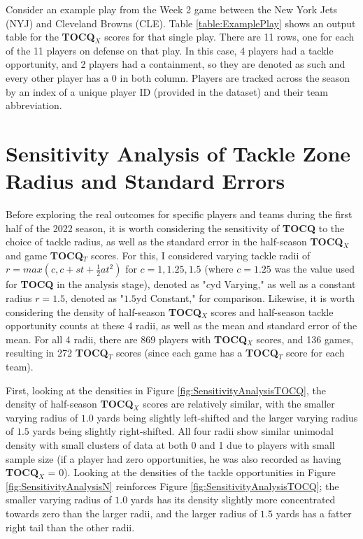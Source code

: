 \documentclass{article}
\begin{document}
Consider an example play from the Week 2 game between the New York Jets (NYJ) and Cleveland Browns (CLE). Table \ref{table:ExamplePlay} shows an output table for the \textbf{TOCQ$_X$} scores for that single play. There are 11 rows, one for each of the 11 players on defense on that play. In this case, 4 players had a tackle opportunity, and 2 players had a containment, so they are denoted as such and every other player has a 0 in both column. Players are tracked across the season by an index of a unique player ID (provided in the dataset) and their team abbreviation.

\section{Sensitivity Analysis of Tackle Zone Radius and Standard Errors}

Before exploring the real outcomes for specific players and teams during the first half of the 2022 season, it is worth considering the sensitivity of \textbf{TOCQ} to the choice of tackle radius, as well as the standard error in the half-season \textbf{TOCQ$_X$} and game \textbf{TOCQ$_T$} scores. For this, I considered varying tackle radii of $r = max(c, c + st + \frac{1}{2}at^2)$ for $c = 1, 1.25, 1.5$ (where $c = 1.25$ was the value used for \textbf{TOCQ} in the analysis stage), denoted as "$c$yd Varying," as well as a constant radius $r = 1.5$, denoted as "$1.5$yd Constant," for comparison. Likewise, it is worth considering the density of half-season \textbf{TOCQ$_X$} scores and half-season tackle opportunity counts at these 4 radii, as well as the mean and standard error of the mean. For all 4 radii, there are 869 players with \textbf{TOCQ$_X$} scores, and 136 games, resulting in 272 \textbf{TOCQ$_T$} scores (since each game has a \textbf{TOCQ$_T$} score for each team).

First, looking at the densities in Figure \ref{fig:SensitivityAnalysisTOCQ}, the density of half-season \textbf{TOCQ$_X$} scores are relatively similar, with the smaller varying radius of $1.0$ yards being slightly left-shifted and the larger varying radius of $1.5$ yards being slightly right-shifted. All four radii show similar unimodal density with small clusters of data at both 0 and 1 due to players with small sample size (if a player had zero opportunities, he was also recorded as having \textbf{TOCQ$_X$} = 0). Looking at the densities of the tackle opportunities in Figure \ref{fig:SensitivityAnalysisN} reinforces Figure \ref{fig:SensitivityAnalysisTOCQ}; the smaller varying radius of $1.0$ yards has its density slightly more concentrated towards zero than the larger radii, and the larger radius of $1.5$ yards has a fatter right tail than the other radii. 
\end{document}
